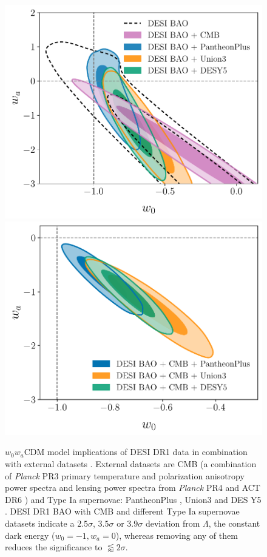 \begin{figure}[htbp]
    \centering
    \includegraphics[width = 0.48\columnwidth]{DR1/w0wa_2by2.pdf}
    \includegraphics[width = 0.47\columnwidth]{DR1/w0wa_DESI-Planck-SN-95lim.pdf}
    \caption[$w_0w_a$CDM model implications of DESI DR1 data in combination with external datasets]{$w_0w_a$CDM model implications of DESI DR1 data in combination with external datasets \citep[figures reproduced from][]{DESI2024.VI.KP7A}.
    External datasets are CMB (a combination of {\it Planck} PR3 primary temperature and polarization anisotropy power spectra \citep{planck_ttee} and lensing power spectra from {\it Planck} PR4 \citep{Planck-PR4-lensing} and ACT DR6 \citep{ACT-lensing-DR6}) and Type Ia supernovae: PantheonPlus \citep{PantheonPlus-cosmo}, Union3 \citep{Union3} and DES Y5 \citep{DES-Y5-SN-cosmo}.
    DESI DR1 BAO with CMB and different Type Ia supernovae datasets indicate a $2.5\sigma$, $3.5\sigma$ or $3.9\sigma$ deviation from $\Lambda$, the constant dark energy ($w_0=-1, w_a=0$), whereas removing any of them reduces the significance to $\lessapprox 2\sigma$.}
    \label{fig:DESI-DR1-w0wa}
\end{figure}

